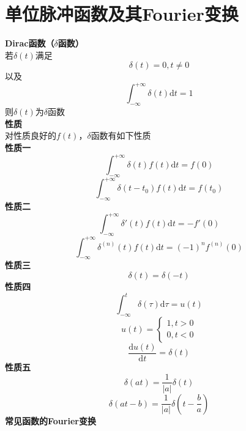 \documentclass[12pt, a4paper, twoside]{ctexbook}
\begin{document}
\section{单位脉冲函数及其Fourier变换}
\textbf{Dirac函数（$\delta$函数）}\\
若$\delta\left(t\right)$满足
$$
\delta\left(t\right)=0,t\ne0
$$
以及
$$
\int_{-\infty}^{+\infty}{\delta\left(t\right)\mathrm{d} t}=1
$$
则$\delta\left(t\right)$为$\delta$函数
~\\

\textbf{性质}\\
对性质良好的$f\left(t\right)$，$\delta$函数有如下性质\\
\hspace*{4em}\textbf{性质一}
$$
\int_{-\infty}^{+\infty}{\delta\left(t\right)f\left(t\right)\mathrm{d}t}=f\left(0\right)
$$
$$
\int_{-\infty}^{+\infty}{\delta\left(t-t_0\right)f\left(t\right)\mathrm{d}t}=f\left(t_0\right)
$$
\hspace*{4em}\textbf{性质二}
$$
\int_{-\infty}^{+\infty}{\delta '\left( t \right) f\left( t \right) \text{d}t}=-f'\left( 0 \right) 
$$
$$
\int_{-\infty}^{+\infty}{\delta ^{\left(n\right)} \left( t \right) f\left( t \right) \text{d}t}=\left( -1 \right) ^nf^{\left( n \right)}\left( 0 \right) 
$$
\hspace*{4em}\textbf{性质三}
$$
\delta\left(t\right)=\delta\left(-t\right)
$$
\hspace*{4em}\textbf{性质四}
$$
\int_{-\infty}^t{\delta \left( \tau \right) \text{d}\tau}=u\left( t \right)
$$
$$
u\left(t\right)=\begin{cases}
    1,t>0\\
    0,t<0
\end{cases}
$$
$$
\frac{\mathrm{d}u\left(t\right)}{\mathrm{d}t}=\delta \left(t\right)
$$
\hspace*{4em}\textbf{性质五}
$$
\delta \left( at \right) =\frac{1}{\left| a \right|}\delta \left( t \right) 
$$
$$
\delta \left( at-b \right) =\frac{1}{\left| a \right|}\delta \left( t-\frac{b}{a} \right) 
$$
\newpage
\textbf{常见函数的Fourier变换}
\end{document}
